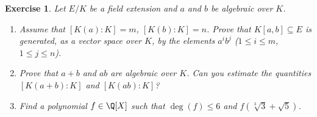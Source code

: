 \documentclass[a4paper,10pt,reqno]{amsart}
\newtheorem{ex}{Exercise}[section]
\begin{document}
\begin{ex}\label{2.2}
    Let $E/K$ be a field extension and 
    $a$ and $b$ be algebraic over $K$.

    \begin{enumerate}
        \item Assume that $[K(a):K] = m$, $[K(b):K] = n$. Prove that $K[a,b] \subseteq E$ is generated, as a vector space over $K$, by the elements $a^ib^j$ ($1 \leq i \leq m$, $1 \leq j \leq n$).
        \item Prove that $a+b$ and $ab$ are algebraic over $K$. Can you estimate the quantities $[K(a+b):K]$ and $[K(ab):K]$?
        \item Find a polynomial $f \in \Q[X]$ such that $\deg(f) \leq 6$ and $f(\sqrt[3]{3} + \sqrt{5})$.
    \end{enumerate}
\end{ex}
\end{document}
